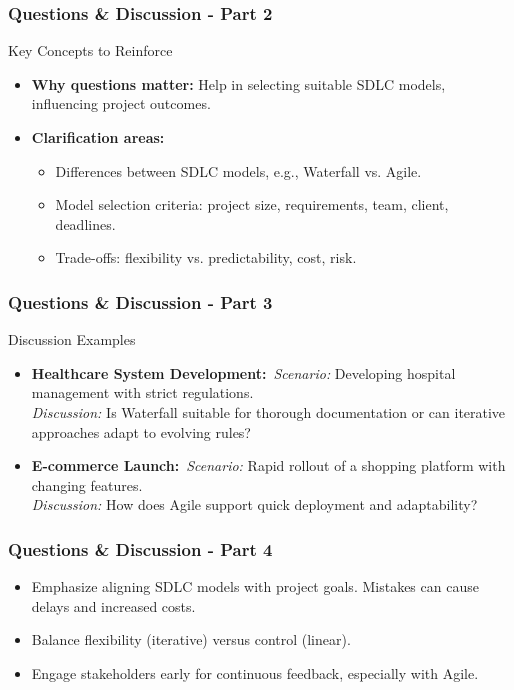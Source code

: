 \documentclass{beamer}
\begin{document}
\begin{frame}[fragile]
  \frametitle{Questions \& Discussion - Part 2}
  \begin{block}{Key Concepts to Reinforce}
    \begin{itemize}
      \item \textbf{Why questions matter:} Help in selecting suitable SDLC models, influencing project outcomes.
      \item \textbf{Clarification areas:}
        \begin{itemize}
          \item Differences between SDLC models, e.g., Waterfall vs. Agile.
          \item Model selection criteria: project size, requirements, team, client, deadlines.
          \item Trade-offs: flexibility vs. predictability, cost, risk.
        \end{itemize}
    \end{itemize}
  \end{block}
\end{frame}

\begin{frame}[fragile]
  \frametitle{Questions \& Discussion - Part 3}
  \begin{block}{Discussion Examples}
    \begin{itemize}
      \item \textbf{Healthcare System Development:}\
      \textit{Scenario:} Developing hospital management with strict regulations. \\
      \textit{Discussion:} Is Waterfall suitable for thorough documentation or can iterative approaches adapt to evolving rules?
      
      \item \textbf{E-commerce Launch:}\
      \textit{Scenario:} Rapid rollout of a shopping platform with changing features. \\
      \textit{Discussion:} How does Agile support quick deployment and adaptability?
    \end{itemize}
  \end{block}
\end{frame}

\begin{frame}[fragile]
  \frametitle{Questions \& Discussion - Part 4}
  \begin{itemize}
    \item Emphasize aligning SDLC models with project goals. Mistakes can cause delays and increased costs.
    \item Balance flexibility (iterative) versus control (linear).
    \item Engage stakeholders early for continuous feedback, especially with Agile.
  \end{itemize}
\end{frame}
\end{document}
